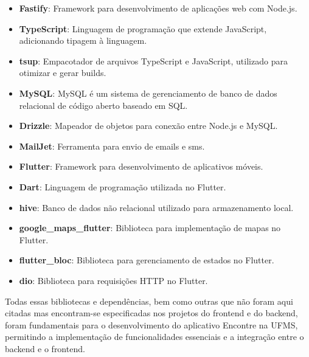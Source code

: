 \begin{itemize}
  \item \textbf{Fastify}: Framework para desenvolvimento de aplicações web com Node.js.
  \item \textbf{TypeScript}: Linguagem de programação que extende JavaScript, adicionando tipagem à linguagem.
  \item \textbf{tsup}: Empacotador de arquivos TypeScript e JavaScript, utilizado para otimizar e gerar builds.
  \item \textbf{MySQL}: MySQL é um sistema de gerenciamento de banco de dados relacional de código aberto baseado em SQL.
  \item \textbf{Drizzle}: Mapeador de objetos para conexão entre Node.js e MySQL.
  \item \textbf{MailJet}: Ferramenta para envio de emails e sms.
  \item \textbf{Flutter}: Framework para desenvolvimento de aplicativos móveis.
  \item \textbf{Dart}: Linguagem de programação utilizada no Flutter.
  \item \textbf{hive}: Banco de dados não relacional utilizado para armazenamento local.
  \item \textbf{google\_maps\_flutter}: Biblioteca para implementação de mapas no Flutter.
  \item \textbf{flutter\_bloc}: Biblioteca para gerenciamento de estados no Flutter.
  \item \textbf{dio}: Biblioteca para requisições HTTP no Flutter.
\end{itemize}

Todas essas bibliotecas e dependências, bem como outras que não foram aqui citadas mas encontram-se especificadas nos projetos do frontend e do backend, foram fundamentais para o desenvolvimento do aplicativo Encontre na UFMS, permitindo a implementação de funcionalidades essenciais e a integração entre o backend e o frontend.